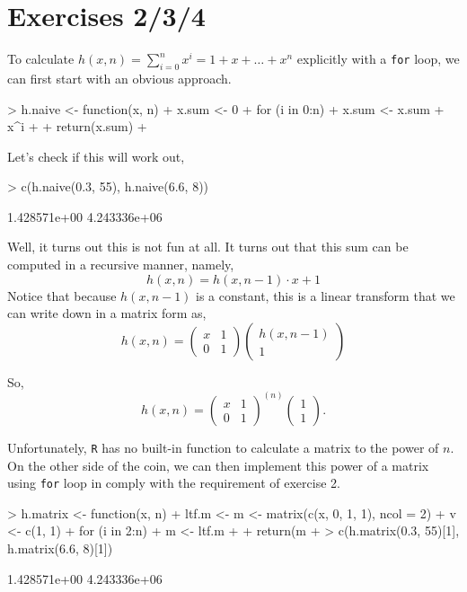\documentclass{article}
\begin{document}
\section{Exercises 2/3/4}
To calculate $h(x, n) = \sum_{i=0}^n x^i = 1 + x + \dots + x^n$ explicitly with a \verb=for= loop, we can first start with an obvious approach.
\begin{Schunk}
\begin{Sinput}
> h.naive <- function(x, n) {
+     x.sum <- 0
+     for (i in 0:n) {
+         x.sum <- x.sum + x^i
+     }
+     return(x.sum)
+ }
\end{Sinput}
\end{Schunk}
Let's check if this will work out,
\begin{Schunk}
\begin{Sinput}
> c(h.naive(0.3, 55), h.naive(6.6, 8))
\end{Sinput}
\begin{Soutput}
[1] 1.428571e+00 4.243336e+06
\end{Soutput}
\end{Schunk}
Well, it turns out this is not fun at all. It turns out that this sum can be computed in a recursive manner, namely, 
\[
h(x, n) = h(x, n-1)\cdot x + 1
\]
Notice that because $h(x, n-1)$ is a constant, this is a linear transform that we can write down in a matrix form as,
\[
h(x, n) = 
    \begin{pmatrix}
        x & 1 \\
        0 & 1
    \end{pmatrix}
    \begin{pmatrix}
        h(x, n-1) \\
        1
    \end{pmatrix}
\]

So,
\[
h(x, n) = 
    \begin{pmatrix}
        x & 1 \\
        0 & 1
    \end{pmatrix}^{(n)}
    \begin{pmatrix}
        1 \\
        1
    \end{pmatrix}.
\]

Unfortunately, \verb=R= has no built-in function to calculate a matrix to the power of $n$. On the other side of the coin, we can then implement this power of a matrix using \verb=for= loop in comply with the requirement of exercise 2.
\begin{Schunk}
\begin{Sinput}
> h.matrix <- function(x, n) {
+     ltf.m <- m <- matrix(c(x, 0, 1, 1), ncol = 2)
+     v <- c(1, 1)
+     for (i in 2:n) {
+         m <- ltf.m %*% m
+     }
+     return(m %*% v)
+ }
> c(h.matrix(0.3, 55)[1], h.matrix(6.6, 8)[1])
\end{Sinput}
\begin{Soutput}
[1] 1.428571e+00 4.243336e+06
\end{Soutput}
\end{Schunk}
\end{document}
